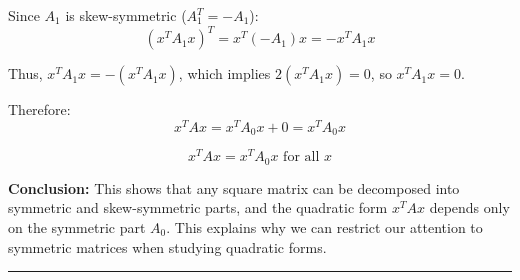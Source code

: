 Since $A_1$ is skew-symmetric ($A_1^T = -A_1$):
$$(x^T A_1 x)^T = x^T (-A_1) x = -x^T A_1 x$$

Thus, $x^T A_1 x = -(x^T A_1 x)$, which implies $2(x^T A_1 x) = 0$, so $x^T A_1 x = 0$.

Therefore:
$$x^T A x = x^T A_0 x + 0 = x^T A_0 x$$

$$\boxed{x^T A x = x^T A_0 x \text{ for all } x}$$

\textbf{Conclusion:} This shows that any square matrix can be decomposed into symmetric and skew-symmetric parts, and the quadratic form $x^T A x$ depends only on the symmetric part $A_0$. This explains why we can restrict our attention to symmetric matrices when studying quadratic forms.

\vspace{2em}
\noindent\rule{\textwidth}{0.4pt}
